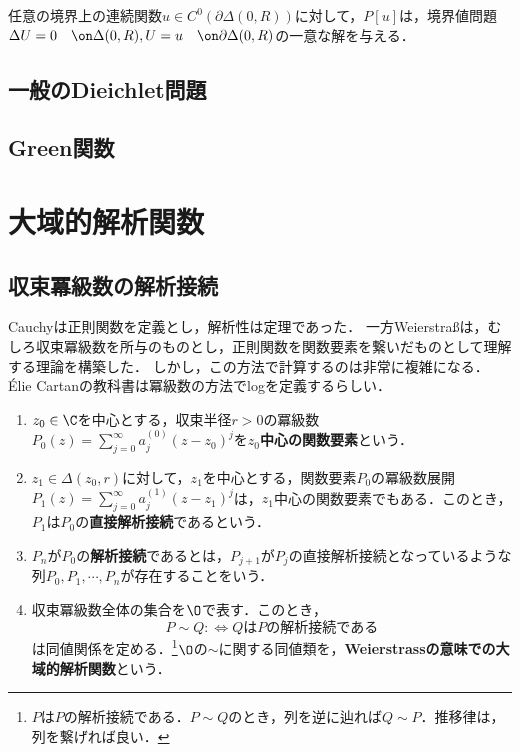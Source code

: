 \documentclass[uplatex, dvipdfmx]{jsreport}
\begin{document}
\begin{theorem}
    任意の境界上の連続関数$u\in C^0(\partial\Delta(0,R))$に対して，$P[u]$は，境界値問題$\Delta U=0\quad\on\Delta(0,R),U=u\quad\on\partial\Delta(0,R)$の一意な解を与える．
\end{theorem}

\section{一般のDieichlet問題}

\section{Green関数}

\chapter{大域的解析関数}

\section{収束冪級数の解析接続}

\begin{tcolorbox}[colframe=ForestGreen, colback=ForestGreen!10!white,breakable,colbacktitle=ForestGreen!40!white,coltitle=black,fonttitle=\bfseries\sffamily,
title=Weierstraßの関数論]
    Cauchyは正則関数を定義とし，解析性は定理であった．
    一方Weierstraßは，むしろ収束冪級数を所与のものとし，正則関数を関数要素を繋いだものとして理解する理論を構築した．
    しかし，この方法で計算するのは非常に複雑になる．Élie Cartanの教科書は冪級数の方法でlogを定義するらしい．
\end{tcolorbox}

\begin{definition}\mbox{}
    \begin{enumerate}
        \item $z_0\in\C$を中心とする，収束半径$r>0$の冪級数$P_0(z)=\sum^\infty_{j=0}a_j^{(0)}(z-z_0)^j$を\textbf{$z_0$中心の関数要素}という．
        \item $z_1\in\Delta(z_0,r)$に対して，$z_1$を中心とする，関数要素$P_0$の冪級数展開$P_1(z)=\sum^\infty_{j=0}a_j^{(1)}(z-z_1)^j$は，$z_1$中心の関数要素でもある．このとき，$P_1$は$P_0$の\textbf{直接解析接続}であるという．
        \item $P_n$が$P_0$の\textbf{解析接続}であるとは，$P_{j+1}$が$P_j$の直接解析接続となっているような列$P_0,P_1,\cdots,P_n$が存在することをいう．
        \item 収束冪級数全体の集合を$\O$で表す．このとき，
        \[P\sim Q:\Leftrightarrow QはPの解析接続である\]
        は同値関係を定める．\footnote{$P$は$P$の解析接続である．$P\sim Q$のとき，列を逆に辿れば$Q\sim P$．推移律は，列を繋げれば良い．}$\O$の$\sim$に関する同値類を，\textbf{Weierstrassの意味での大域的解析関数}という．
    \end{enumerate}
\end{definition}
\end{document}
